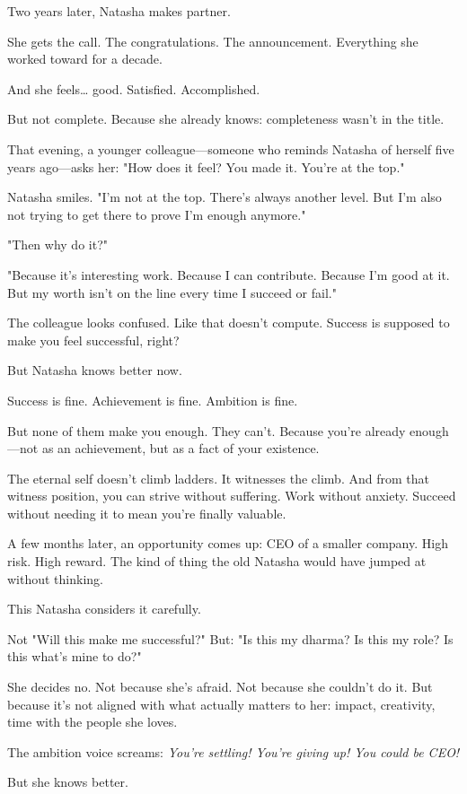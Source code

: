 \documentclass[11pt,twoside]{book}
\begin{document}
Two years later, Natasha makes partner.

She gets the call. The congratulations. The announcement. Everything she worked toward for a decade.

And she feels\ldots{} good. Satisfied. Accomplished.

But not complete. Because she already knows: completeness wasn't in the title.

That evening, a younger colleague—someone who reminds Natasha of herself five years ago—asks her: "How does it feel? You made it. You're at the top."

Natasha smiles. "I'm not at the top. There's always another level. But I'm also not trying to get there to prove I'm enough anymore."

"Then why do it?"

"Because it's interesting work. Because I can contribute. Because I'm good at it. But my worth isn't on the line every time I succeed or fail."

The colleague looks confused. Like that doesn't compute. Success is supposed to make you feel successful, right?

But Natasha knows better now.

Success is fine. Achievement is fine. Ambition is fine.

But none of them make you enough. They can't. Because you're already enough—not as an achievement, but as a fact of your existence.

The eternal self doesn't climb ladders. It witnesses the climb. And from that witness position, you can strive without suffering. Work without anxiety. Succeed without needing it to mean you're finally valuable.

A few months later, an opportunity comes up: CEO of a smaller company. High risk. High reward. The kind of thing the old Natasha would have jumped at without thinking.

This Natasha considers it carefully.

Not "Will this make me successful?" But: "Is this my dharma? Is this my role? Is this what's mine to do?"

She decides no. Not because she's afraid. Not because she couldn't do it. But because it's not aligned with what actually matters to her: impact, creativity, time with the people she loves.

The ambition voice screams: \emph{You're settling! You're giving up! You could be CEO!}

But she knows better.
\end{document}
